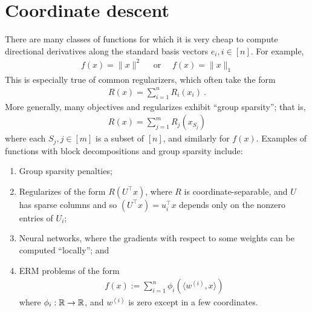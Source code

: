 \section{Coordinate descent}
There are many classes of functions for which it is very cheap 
to compute directional derivatives along the standard basis vectors
$e_i, i \in [n]$.
%
For example, 
%
\begin{eqnarray}
f(x) = \|x\|^2\quad \text{ or }\quad f(x) = \|x\|_1
\end{eqnarray}
%
This is especially true of common regularizers, 
%
which often take the form 
\begin{eqnarray}
R(x) = \sum_{i=1}^n R_i(x_i) \ .
\end{eqnarray}
%
More generally, many objectives and regularizes exhibit ``group sparsity''; that is,
%
\begin{eqnarray}
R(x) =  \sum_{j=1}^m R_{j}(x_{S_j})
\end{eqnarray}
where each $S_j, j \in [m]$ is a subset of $[n]$, and similarly for $f(x)$.
%
Examples of functions with block decompositions and group sparsity include:
\begin{enumerate} 
	\item Group sparsity penalties;
	\item Regularizes of the form $R(U^\top x)$, where $R$ is
    coordinate-separable, and $U$ has sparse columns and so
    $(U^\top x) = u_i^\top x$ depends only on the nonzero entries of $U_i$;
	\item Neural networks, where the gradients with respect to some weights can be
    computed ``locally''; and
	\item ERM problems of the form 
    \begin{eqnarray}
    f(x) := \sum_{i=1}^n \phi_i(\langle w^{(i)} , x \rangle )
    \end{eqnarray}
    where $\phi_i: \mathbb{R} \to \mathbb{R}$, and $w^{(i)}$ is zero except in a few coordinates. 
\end{enumerate} 

